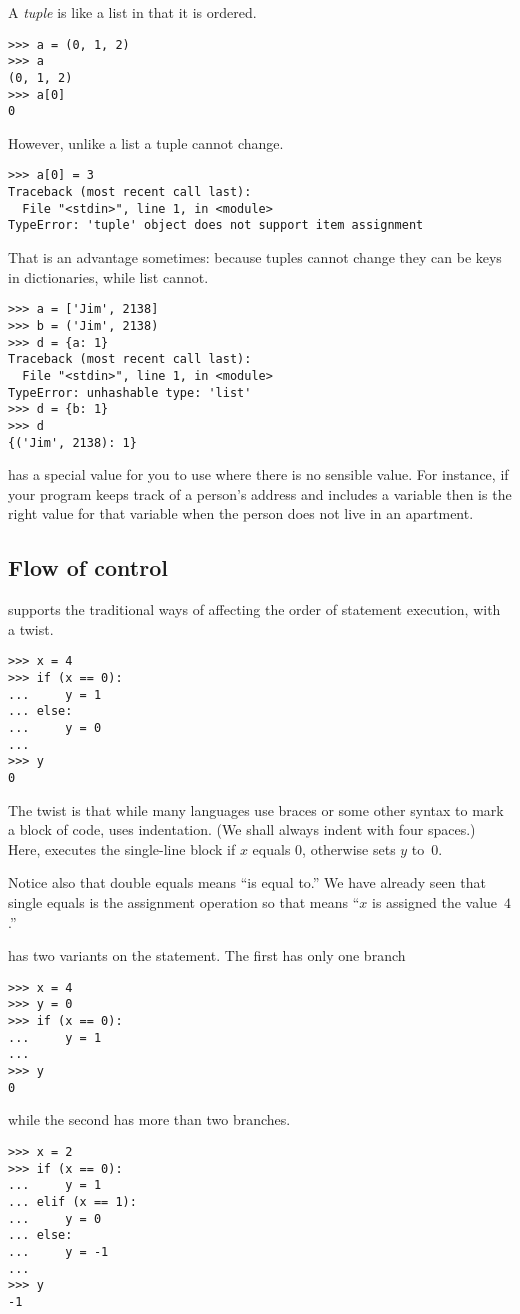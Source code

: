 A \textit{tuple} is like a list in that it is ordered.
\begin{lstlisting}[style=python]
>>> a = (0, 1, 2)
>>> a
(0, 1, 2)
>>> a[0]
0
\end{lstlisting}
However, unlike a list a tuple cannot change.
\begin{lstlisting}[style=python]
>>> a[0] = 3
Traceback (most recent call last):
  File "<stdin>", line 1, in <module>
TypeError: 'tuple' object does not support item assignment
\end{lstlisting}
That is an advantage sometimes:
because tuples cannot change they can be keys in dictionaries, while
list cannot.
\begin{lstlisting}[style=python]
>>> a = ['Jim', 2138]
>>> b = ('Jim', 2138)
>>> d = {a: 1}
Traceback (most recent call last):
  File "<stdin>", line 1, in <module>
TypeError: unhashable type: 'list'
>>> d = {b: 1}
>>> d
{('Jim', 2138): 1}
\end{lstlisting}

\python{} has a special value  for you to use
where there is no sensible value.
For instance, if your program keeps track of a person's address and
includes a variable  then  is
the right value for that variable when the person does not live in an
apartment.



\subsection{Flow of control}
\python{} supports the traditional ways of affecting the order of 
statement execution, with a twist.
\begin{lstlisting}[style=python]
>>> x = 4
>>> if (x == 0):
...     y = 1
... else:
...     y = 0
... 
>>> y
0
\end{lstlisting}
The twist is that while many languages use braces or some other syntax to
mark a block of code, \python{} uses indentation.
(We shall always indent with four spaces.)
Here, \python{} executes the single-line block  if $x$
equals $0$, otherwise \python{} sets $y$ to~$0$. 

Notice also that double equals \inlinecode{==} means ``is equal to.'' 
We have already seen that single equals is the assignment
operation so that  
means ``$x$ is assigned the value~$4$.'' 

\python{} has two variants on the  statement.
The first has only one branch
\begin{lstlisting}[style=python]
>>> x = 4
>>> y = 0
>>> if (x == 0):
...     y = 1
... 
>>> y
0
\end{lstlisting}
while the second has more than two branches.
\begin{lstlisting}[style=python]
>>> x = 2
>>> if (x == 0):
...     y = 1
... elif (x == 1):
...     y = 0
... else:
...     y = -1
... 
>>> y
-1
\end{lstlisting}

